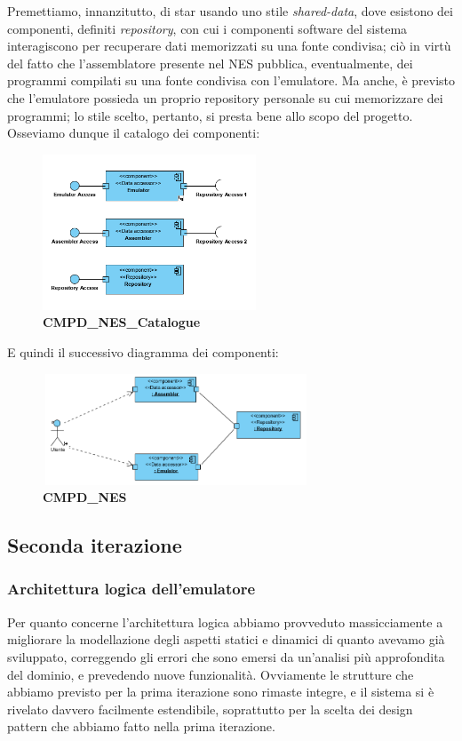 \documentclass[11pt]{article}
\begin{document}
Premettiamo, innanzitutto, di star usando uno stile \emph{shared-data}, dove esistono dei componenti, definiti \emph{repository}, con cui i componenti software del sistema interagiscono per recuperare dati memorizzati su una fonte condivisa; ciò in virtù del fatto che l'assemblatore presente nel NES pubblica, eventualmente, dei programmi compilati su una fonte condivisa con l'emulatore. Ma anche, è previsto che l'emulatore possieda un proprio repository personale su cui memorizzare dei programmi; lo stile scelto, pertanto, si presta bene allo scopo del progetto. \clearpage
Osseviamo dunque il catalogo dei componenti:
\begin{figure}[h]
\centering
\includegraphics[width=240px, height=175px]{CMPD_NES_Catalogue.png}\\
\small\textbf{CMPD\_NES\_Catalogue}
\end{figure}
E quindi il successivo diagramma dei componenti:
\begin{figure}[h]
\centering
\includegraphics[width=300px, height=125px]{CMPD_NES.png}\\
\small\textbf{CMPD\_NES}
\end{figure}
\clearpage
\subsection{Seconda iterazione}
\subsubsection{Architettura logica dell'emulatore}
Per quanto concerne l'architettura logica abbiamo provveduto massicciamente a migliorare la modellazione degli aspetti statici e dinamici di quanto avevamo già sviluppato, correggendo gli errori che sono emersi da un'analisi più approfondita del dominio, e prevedendo nuove funzionalità. Ovviamente le strutture che abbiamo previsto per la prima iterazione sono rimaste integre, e il sistema si è rivelato davvero facilmente estendibile, soprattutto per la scelta dei design pattern che abbiamo fatto nella prima iterazione.
\end{document}
